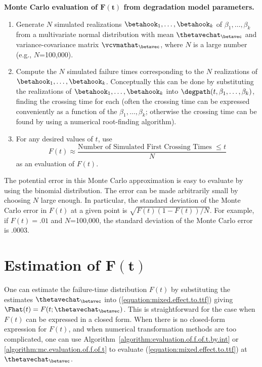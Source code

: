 \begin{algorithm}{\bfseries Monte Carlo evaluation
of $\boldsymbol{F(t)}$ from degradation model parameters.}
\label{algorithm:mc.evaluation.of.f.of.t}
\begin{enumerate}
\item
Generate $N$ simulated realizations
$\betahook_{1},\dots,\betahook_{k} $ of $\beta_{1},\dots,\beta_{k}$
from a multivariate normal distribution with mean
$\thetavechat_{\betavec}$
and variance-covariance matrix $\vcvmathat_{\betavec}$,
where $N$ is a large number (e.g., $N$=100,000).
\item
Compute the $N$ simulated failure times corresponding to the $N$
realizations of $\betahook_{1},\dots,\betahook_{k}$. Conceptually this
can be done by substituting the realizations of
$\betahook_{1},\dots,\betahook_{k}$ into
$\degpath(t,\beta_{1},\dots,\beta_{k})$, finding the crossing time for
each (often the crossing time can be expressed conveniently as a
function of the $\beta_{1},\dots,\beta_{k}$; otherwise the crossing
time can be found by using a numerical root-finding algorithm).
\item
For any desired values of $t$, use
\begin{displaymath} 
F(t) \approx \frac{\text{Number of Simulated First Crossing Times }  
\leq t}{N} 
\end{displaymath}
as an evaluation of $F(t)$.
\end{enumerate}
\end{algorithm}
The potential error in this Monte Carlo approximation is easy to
evaluate by using the binomial distribution. The error can be made
arbitrarily small by choosing $N$ large enough. In particular,
the standard deviation of the Monte Carlo error in $F(t)$ at a given
point
is $\sqrt{F(t)(1-F(t))/N}$. For example, if $F(t)=.01$ 
and $N$=100,000, the standard deviation of the Monte Carlo error is .0003.

\section{Estimation of $\boldsymbol{F(t)}$} 
\label{section:est.ft}

One can estimate the
failure-time distribution $F(t)$ by substituting the estimates
$\thetavechat_{\betavec}$ into (\ref{equation:mixed.effect.to.ttf}) giving
$\Fhat(t) =
F(t; \thetavechat_{\betavec})$.
This is straightforward for the case when $F(t)$ can be expressed in a
closed form.  When there is no closed-form expression for $F(t)$, and
when numerical transformation methods are too complicated, one can  
use Algorithm~\ref{algorithm:evaluation.of.f.of.t.by.int} 
or \ref{algorithm:mc.evaluation.of.f.of.t} to evaluate 
(\ref{equation:mixed.effect.to.ttf}) at $\thetavechat_{\betavec}$.

